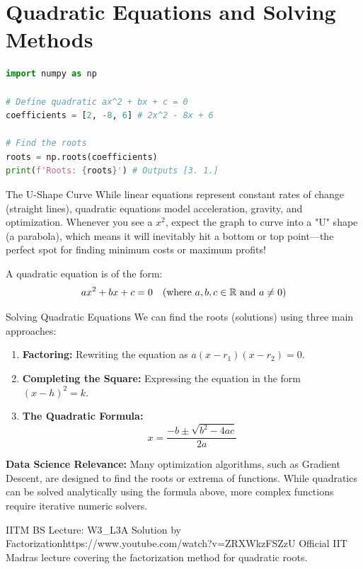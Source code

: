 \section{Quadratic Equations and Solving Methods}

\begin{lstlisting}[language=Python, caption=Data Science: Finding Roots of a Quadratic]
import numpy as np

# Define quadratic ax^2 + bx + c = 0
coefficients = [2, -8, 6] # 2x^2 - 8x + 6

# Find the roots
roots = np.roots(coefficients)
print(f'Roots: {roots}') # Outputs [3. 1.]
\end{lstlisting}


\begin{intuitionbox}{The U-Shape Curve}
While linear equations represent constant rates of change (straight lines), quadratic equations model acceleration, gravity, and optimization. Whenever you see a $x^2$, expect the graph to curve into a "U" shape (a parabola), which means it will inevitably hit a bottom or top point---the perfect spot for finding minimum costs or maximum profits!
\end{intuitionbox}

A quadratic equation is of the form:
$$ax^2 + bx + c = 0 \quad (\text{where } a, b, c \in \mathbb{R} \text{ and } a \neq 0)$$

\begin{formulabox}{Solving Quadratic Equations}
We can find the roots (solutions) using three main approaches:
\begin{enumerate}
    \item \textbf{Factoring:} Rewriting the equation as $a(x-r_1)(x-r_2) = 0$.
    \item \textbf{Completing the Square:} Expressing the equation in the form $(x-h)^2 = k$.
    \item \textbf{The Quadratic Formula:}
    $$x = \frac{-b \pm \sqrt{b^2 - 4ac}}{2a}$$
\end{enumerate}
\end{formulabox}

\textbf{Data Science Relevance:} Many optimization algorithms, such as Gradient Descent, are designed to find the roots or extrema of functions. While quadratics can be solved analytically using the formula above, more complex functions require iterative numeric solvers.

\begin{videocard}{IITM BS Lecture: W3\_L3A Solution by Factorization}{https://www.youtube.com/watch?v=ZRXWkzFSZzU}
Official IIT Madras lecture covering the factorization method for quadratic roots.
\end{videocard}

